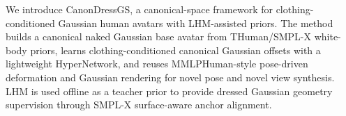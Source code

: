 We introduce CanonDressGS, a canonical-space framework for clothing-conditioned Gaussian human avatars with LHM-assisted priors. The method builds a canonical naked Gaussian base avatar from THuman/SMPL-X white-body priors, learns clothing-conditioned canonical Gaussian offsets with a lightweight HyperNetwork, and reuses MMLPHuman-style pose-driven deformation and Gaussian rendering for novel pose and novel view synthesis. LHM is used offline as a teacher prior to provide dressed Gaussian geometry supervision through SMPL-X surface-aware anchor alignment.
